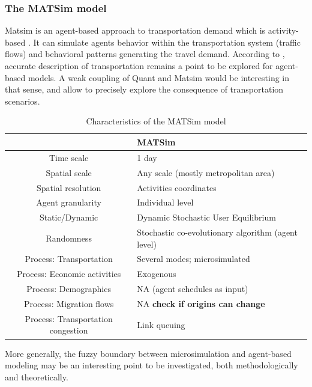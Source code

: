 \documentclass[11pt]{article}
\begin{document}
\subsubsection{The MATSim model}

 Matsim is an agent-based approach to transportation demand which is activity-based \cite{horni2016multi}. It can simulate agents behavior within the transportation system (traffic flows) and behavioral patterns generating the travel demand. According to \cite{wise2016transportation}, accurate description of transportation remains a point to be explored for agent-based models. A weak coupling of Quant and Matsim would be interesting in that sense, and allow to precisely explore the consequence of transportation scenarios.

\begin{table}
\caption{Characteristics of the MATSim model}
\begin{tabular}{|c|p{6cm}|}
	\toprule
	& MATSim \\
	\midrule
Time scale & 1 day \\
Spatial scale & Any scale (mostly metropolitan area)\\
Spatial resolution & Activities coordinates \\
Agent granularity & Individual level \\
Static/Dynamic & Dynamic Stochastic User Equilibrium \\
Randomness & Stochastic co-evolutionary algorithm (agent level) \\
Process: Transportation & Several modes; microsimulated\\
Process: Economic activities & Exogenous \\
Process: Demographics & NA (agent schedules as input) \\
Process: Migration flows & NA \textbf{check if origins can change} \\
Process: Transportation congestion & Link queuing \\
\bottomrule
	\end{tabular}
\end{table}



 More generally, the fuzzy boundary between microsimulation and agent-based modeling may be an interesting point to be investigated, both methodologically and theoretically.








\end{document}
